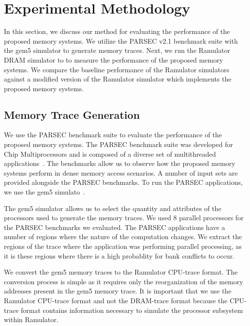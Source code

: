\section{Experimental Methodology}
\label{sec:experimentalmethodology}

In this section, we discuss our method for evaluating the performance of the proposed memory systems. We utilize the PARSEC v2.1 benchmark suite with the gem5 simulator to generate memory traces. Next, we run the Ramulator DRAM simulator to to measure the performance of the proposed memory systems. We compare the baseline performance of the Ramulator simulators against a modified version of the Ramulator simulator which implements the proposed memory systems.

\subsection{Memory Trace Generation}

We use the PARSEC benchmark suite to evaluate the performance of the proposed memory systems. The PARSEC benchmark suite was developed for Chip Multiprocessors and is composed of a diverse set of multithreaded applications~\cite{bienia09parsec2}. The benchmarks allow us to observe how the proposed memory systems perform in dense memory access scenarios. A number of input sets are provided alongside the PARSEC benchmarks. To run the PARSEC applications, we use the gem5 simulato~\cite{parsec_2_1_m5}.

The gem5 simulator allows us to select the quantity and attributes of the processors used to generate the memory traces. We used 8 parallel processors for the PARSEC benchmarks we evaluated. The PARSEC applications have a number of regions where the nature of the computation changes. We extract the regions of the trace where the application was performing parallel processing, as it is these regions where there is a high probablity for bank conflicts to occur. 


We convert the gem5 memory traces to the Ramulator CPU-trace format. The conversion process is simple as it requires only the reorganization of the memory addresses present in the gem5 memory trace. It is important that we use the Ramulator CPU-trace format and not the DRAM-trace format because the CPU-trace format contains information necessary to simulate the processor subsystem within Ramulator.

